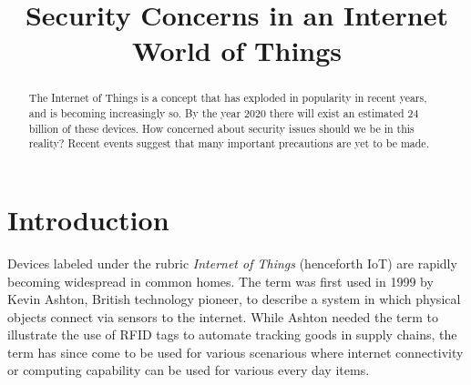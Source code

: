\documentclass[a4paper, conference]{IEEEtran/IEEEtran}
\begin{document}
%
\title{Security Concerns in an Internet World of Things}

\author{
}

\maketitle

\begin{abstract}
The Internet of Things is a concept that has exploded in popularity in recent years, and is becoming increasingly so. By the year 2020 there will exist an estimated 24 billion of these devices.\cite{meola} How concerned about security issues should we be in this reality? Recent events suggest that many important precautions are yet to be made.
\end{abstract}

%
\IEEEpeerreviewmaketitle

\section{Introduction}
Devices labeled under the rubric \textit{Internet of Things} (henceforth IoT) are rapidly becoming widespread in common homes.\cite{mulani} The term was first used in 1999 by Kevin Ashton, British technology pioneer, to describe a system in which physical objects connect via sensors to the internet. While Ashton needed the term to illustrate the use of RFID tags to automate tracking goods in supply chains, the term has since come to be used for various scenarious where internet connectivity or computing capability can be used for various every day items. 
\end{document}
